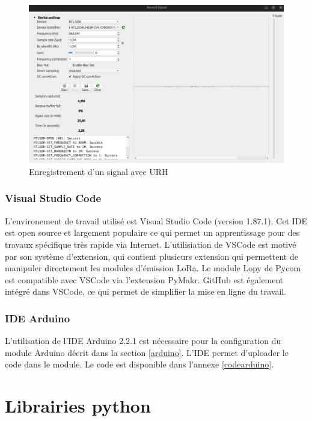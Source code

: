 \begin{figure}[h]
\centering

\includegraphics[scale=0.16]{images/urh1.png}
\caption{Enregistrement d'un signal avec URH}\label{term39}
\end{figure}


\subsubsection{Visual Studio Code}

L'environement de travail utilisé est Visual Studio Code (version 1.87.1). Cet IDE est open source et largement populaire ce qui permet un apprentissage pour des travaux spécifique très rapide via Internet. L'utilisiation de VSCode est motivé par son système d'extension, qui contient plusieurs extension qui permettent de manipuler directement les modules d'émission LoRa. Le module Lopy de Pycom est compatible avec VSCode via l'extension PyMakr. GitHub est également intégré dans VSCode, ce qui permet de simplifier la mise en ligne du travail.

\subsubsection{IDE Arduino}

L'utilisation de l'IDE Arduino 2.2.1 est nécessaire pour la configuration du module Arduino décrit dans la section \ref{arduino}. L'IDE permet d'uploader le code  dans le module. Le code est disponible dans l'annexe \ref{codearduino}.

\section{Librairies python}

